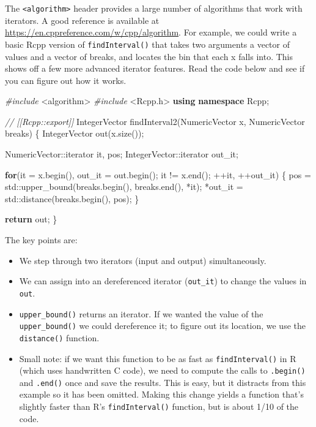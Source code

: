 \documentclass[]{book}
\makeatletter
\newenvironment{Shaded}{\begin{snugshade}}{\end{snugshade}}
\newcommand{\BuiltInTok}[1]{#1}
\newcommand{\CommentTok}[1]{\textcolor[rgb]{0.37,0.37,0.37}{\textit{#1}}}
\newcommand{\ControlFlowTok}[1]{\textcolor[rgb]{0.27,0.27,0.27}{\textbf{#1}}}
\newcommand{\ImportTok}[1]{#1}
\newcommand{\KeywordTok}[1]{\textcolor[rgb]{0.27,0.27,0.27}{\textbf{#1}}}
\newcommand{\NormalTok}[1]{#1}
\newcommand{\PreprocessorTok}[1]{\textcolor[rgb]{0.37,0.37,0.37}{\textit{#1}}}
\newcommand{\indexc}[1]{\index{#1@\texttt{#1}}}
\makeatother
\begin{document}
The \texttt{\textless{}algorithm\textgreater{}} header provides a large number of algorithms that work with iterators. A good reference is available at \url{https://en.cppreference.com/w/cpp/algorithm}. For example, we could write a basic Rcpp version of \texttt{findInterval()} that takes two arguments a vector of values and a vector of breaks, and locates the bin that each x falls into. This shows off a few more advanced iterator features. Read the code below and see if you can figure out how it works. \indexc{findInterval()}

\begin{Shaded}
\begin{Highlighting}[]
\PreprocessorTok{#include }\ImportTok{<algorithm>}
\PreprocessorTok{#include }\ImportTok{<Rcpp.h>}
\KeywordTok{using} \KeywordTok{namespace}\NormalTok{ Rcpp;}

\CommentTok{// [[Rcpp::export]]}
\NormalTok{IntegerVector findInterval2(NumericVector x, NumericVector breaks) \{}
\NormalTok{  IntegerVector out(x.size());}

\NormalTok{  NumericVector::iterator it, pos;}
\NormalTok{  IntegerVector::iterator out_it;}

  \ControlFlowTok{for}\NormalTok{(it = x.begin(), out_it = out.begin(); it != x.end(); }
\NormalTok{      ++it, ++out_it) \{}
\NormalTok{    pos = }\BuiltInTok{std::}\NormalTok{upper_bound(breaks.begin(), breaks.end(), *it);}
\NormalTok{    *out_it = }\BuiltInTok{std::}\NormalTok{distance(breaks.begin(), pos);}
\NormalTok{  \}}

  \ControlFlowTok{return}\NormalTok{ out;}
\NormalTok{\}}
\end{Highlighting}
\end{Shaded}

The key points are:

\begin{itemize}
\item
  We step through two iterators (input and output) simultaneously.
\item
  We can assign into an dereferenced iterator (\texttt{out\_it}) to change the values
  in \texttt{out}.
\item
  \texttt{upper\_bound()} returns an iterator. If we wanted the value of the
  \texttt{upper\_bound()} we could dereference it; to figure out its location, we
  use the \texttt{distance()} function.
\item
  Small note: if we want this function to be as fast as \texttt{findInterval()} in R
  (which uses handwritten C code), we need to compute the calls to \texttt{.begin()}
  and \texttt{.end()} once and save the results. This is easy, but it distracts from
  this example so it has been omitted. Making this change yields a function
  that's slightly faster than R's \texttt{findInterval()} function, but is about 1/10
  of the code.
\end{itemize}
\end{document}
